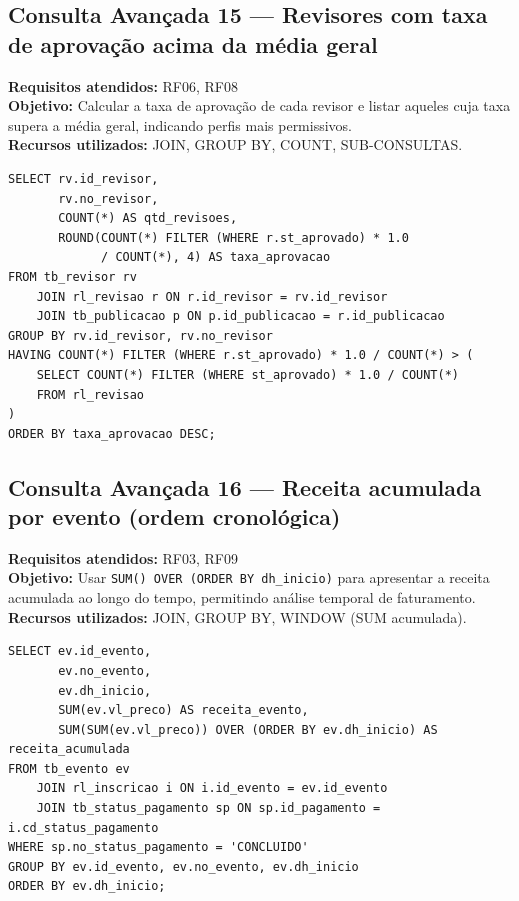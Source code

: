 \documentclass[12pt,a4paper]{article}
\begin{document}
\subsection{Consulta Avançada 15 --- Revisores com taxa de aprovação acima da média geral}
\textbf{Requisitos atendidos:} RF06, RF08 \\
\textbf{Objetivo:} Calcular a taxa de aprovação de cada revisor e listar aqueles cuja taxa supera a média geral, indicando perfis mais permissivos. \\
\textbf{Recursos utilizados:} JOIN, GROUP BY, COUNT, SUB-CONSULTAS.
\begin{lstlisting}[caption={QA15 --- Revisores com taxa de aprovação acima da média geral.}]
SELECT rv.id_revisor,
       rv.no_revisor,
       COUNT(*) AS qtd_revisoes,
       ROUND(COUNT(*) FILTER (WHERE r.st_aprovado) * 1.0
             / COUNT(*), 4) AS taxa_aprovacao
FROM tb_revisor rv
    JOIN rl_revisao r ON r.id_revisor = rv.id_revisor
    JOIN tb_publicacao p ON p.id_publicacao = r.id_publicacao
GROUP BY rv.id_revisor, rv.no_revisor
HAVING COUNT(*) FILTER (WHERE r.st_aprovado) * 1.0 / COUNT(*) > (
    SELECT COUNT(*) FILTER (WHERE st_aprovado) * 1.0 / COUNT(*)
    FROM rl_revisao
)
ORDER BY taxa_aprovacao DESC;
\end{lstlisting}

\subsection{Consulta Avançada 16 --- Receita acumulada por evento (ordem cronológica)}
\textbf{Requisitos atendidos:} RF03, RF09 \\
\textbf{Objetivo:} Usar \texttt{SUM() OVER (ORDER BY dh\_inicio)} para apresentar a receita acumulada ao longo do tempo, permitindo análise temporal de faturamento. \\
\textbf{Recursos utilizados:} JOIN, GROUP BY, WINDOW (SUM acumulada).
\begin{lstlisting}[caption={QA16 --- Receita acumulada por evento (ordem cronológica).}]
SELECT ev.id_evento,
       ev.no_evento,
       ev.dh_inicio,
       SUM(ev.vl_preco) AS receita_evento,
       SUM(SUM(ev.vl_preco)) OVER (ORDER BY ev.dh_inicio) AS receita_acumulada
FROM tb_evento ev
    JOIN rl_inscricao i ON i.id_evento = ev.id_evento
    JOIN tb_status_pagamento sp ON sp.id_pagamento = i.cd_status_pagamento
WHERE sp.no_status_pagamento = 'CONCLUIDO'
GROUP BY ev.id_evento, ev.no_evento, ev.dh_inicio
ORDER BY ev.dh_inicio;
\end{lstlisting}
\end{document}
